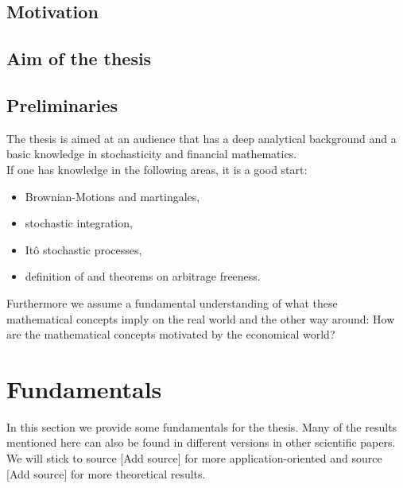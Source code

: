 \documentclass[12pt]{article}
\begin{document}
	\subsection{Motivation}
	\subsection{Aim of the thesis}
	\subsection{Preliminaries}
	The thesis is aimed at an audience that has a deep analytical background and a basic knowledge in stochasticity and financial mathematics.\\
	\color{red}If one has knowledge in the following areas, it is a good start:\color{black}
	\begin{itemize}
		\item Brownian-Motions and martingales,
		\item stochastic integration,
		\item Itô stochastic processes,
		\item definition of and theorems on arbitrage freeness.
	\end{itemize}
	Furthermore we assume a fundamental understanding of what these mathematical concepts imply on the real world and the other way around: How are the mathematical concepts motivated by the economical world?
	
	
	
	
	
	
	
	\pagebreak
	\section{Fundamentals}
	In this section we provide some fundamentals for the thesis. Many of the results mentioned here can also be found in different versions in other scientific papers. We will stick to source 
	\color{red}[Add source] \color{black} %
	for more application-oriented and source 
	\color{red}[Add source] \color{black} %
	for more theoretical results.
	
\end{document}
